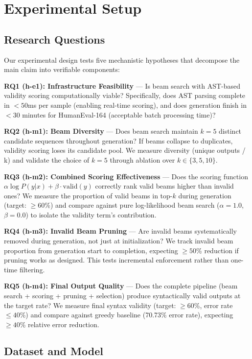 \section{Experimental Setup}

\subsection{Research Questions}

Our experimental design tests five mechanistic hypotheses that decompose the main claim into verifiable components:

\textbf{RQ1 (h-e1): Infrastructure Feasibility} --- Is beam search with AST-based validity scoring computationally viable? Specifically, does AST parsing complete in $<50$ms per sample (enabling real-time scoring), and does generation finish in $<30$ minutes for HumanEval-164 (acceptable batch processing time)?

\textbf{RQ2 (h-m1): Beam Diversity} --- Does beam search maintain $k=5$ distinct candidate sequences throughout generation? If beams collapse to duplicates, validity scoring loses its candidate pool. We measure diversity (unique outputs / k) and validate the choice of $k=5$ through ablation over $k \in \{3, 5, 10\}$.

\textbf{RQ3 (h-m2): Combined Scoring Effectiveness} --- Does the scoring function $\alpha \log P(y|x) + \beta \cdot \text{valid}(y)$ correctly rank valid beams higher than invalid ones? We measure the proportion of valid beams in top-$k$ during generation (target: $\geq 60$\%) and compare against pure log-likelihood beam search ($\alpha=1.0$, $\beta=0.0$) to isolate the validity term's contribution.

\textbf{RQ4 (h-m3): Invalid Beam Pruning} --- Are invalid beams systematically removed during generation, not just at initialization? We track invalid beam proportion from generation start to completion, expecting $\geq 50$\% reduction if pruning works as designed. This tests incremental enforcement rather than one-time filtering.

\textbf{RQ5 (h-m4): Final Output Quality} --- Does the complete pipeline (beam search + scoring + pruning + selection) produce syntactically valid outputs at the target rate? We measure final syntax validity (target: $\geq 60$\%, error rate $\leq 40$\%) and compare against greedy baseline (70.73\% error rate), expecting $\geq 40$\% relative error reduction.

\subsection{Dataset and Model}

